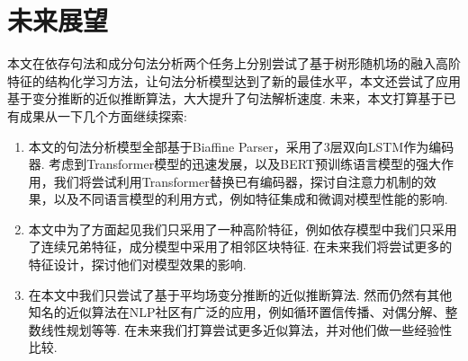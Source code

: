 \section{未来展望}
本文在依存句法和成分句法分析两个任务上分别尝试了基于树形随机场的融入高阶特征的结构化学习方法，让句法分析模型达到了新的最佳水平，本文还尝试了应用基于变分推断的近似推断算法，大大提升了句法解析速度.
未来，本文打算基于已有成果从一下几个方面继续探索:
\begin{enumerate}
  \item 本文的句法分析模型全部基于Biaffine Parser，采用了3层双向LSTM作为编码器.
        考虑到Transformer模型的迅速发展，以及BERT预训练语言模型的强大作用，我们将尝试利用Transformer替换已有编码器，探讨自注意力机制的效果，以及不同语言模型的利用方式，例如特征集成和微调对模型性能的影响.
  \item 本文中为了方面起见我们只采用了一种高阶特征，例如依存模型中我们只采用了连续兄弟特征，成分模型中采用了相邻区块特征.
        在未来我们将尝试更多的特征设计，探讨他们对模型效果的影响.
  \item 在本文中我们只尝试了基于平均场变分推断的近似推断算法.
        然而仍然有其他知名的近似算法在NLP社区有广泛的应用，例如循环置信传播、对偶分解、整数线性规划等等.
        在未来我们打算尝试更多近似算法，并对他们做一些经验性比较.
\end{enumerate}
